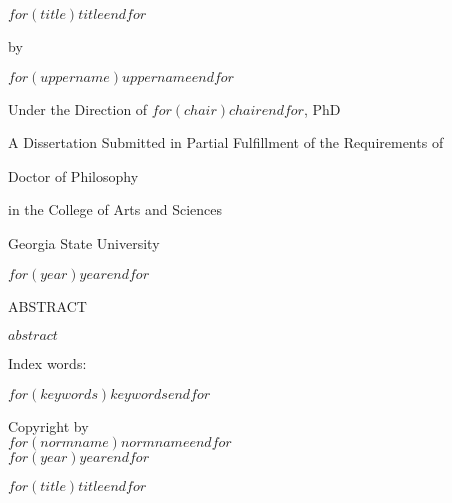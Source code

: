 \documentclass[12pt]{report}
\providecommand{\titlediss}{$for(title)$$title$$endfor$}
\renewenvironment{abstract}{
\begin{center}
{ABSTRACT \vspace{0.2in}}
\end{center}
}{}
\begin{document}
\thispagestyle{empty}

\begin{center}
\parbox[]{\textwidth}{\centering\titlediss}
\end{center}
\vspace{0.4in}
\centerline{by}
\vspace*{0.5in}
\centerline{$for(uppername)$$uppername$$endfor$}
\vspace*{0.5in}
\centerline{Under the Direction of $for(chair)$$chair$$endfor$, PhD}
\vspace{1.0in}



\centerline{A Dissertation Submitted in Partial Fulfillment of the Requirements of }
\centerline{Doctor of Philosophy}
\centerline{in the College of Arts and Sciences}
\centerline{Georgia State University}
\centerline{$for(year)$$year$$endfor$}
\newpage

\newpage

\thispagestyle{empty}

\begin{abstract}

$abstract$


\end{abstract}
\begin{singlespace}
  \vspace{0.5in}
  \noindent Index words: 
  \hspace{0.2in}
  \parbox[t]{4.5in}{$for(keywords)$$keywords$$endfor$}
\end{singlespace}

\newpage

\thispagestyle{empty}

\vspace*{0.7\textheight}
\begin{center}
  \parbox[]{\textwidth}{
    \begin{center}
      Copyright by \\
      $for(normname)$$normname$$endfor$ \\
      $for(year)$$year$$endfor$
    \end{center}}
\end{center}

\newpage


\thispagestyle{empty}



\begin{center}
  \parbox[]{\textwidth}{\centering \titlediss}
  \end{center}
\end{document}
